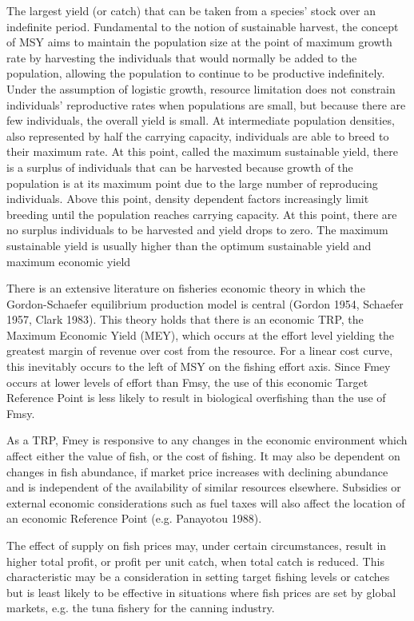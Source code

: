 \documentclass[12pt,oneline,a4paper,numbib]{ouparticle}
\numberwithin{equation}{subsection} %
\begin{document}
The largest yield (or catch) that can be taken from a species' stock over an indefinite period. Fundamental to the notion of sustainable harvest, the concept of MSY aims to maintain the population size at the point of maximum growth rate by harvesting the individuals that would normally be added to the population, allowing the population to continue to be productive indefinitely. Under the assumption of logistic growth, resource limitation does not constrain individuals’ reproductive rates when populations are small, but because there are few individuals, the overall yield is small. At intermediate population densities, also represented by half the carrying capacity, individuals are able to breed to their maximum rate. At this point, called the maximum sustainable yield, there is a surplus of individuals that can be harvested because growth of the population is at its maximum point due to the large number of reproducing individuals. Above this point, density dependent factors increasingly limit breeding until the population reaches carrying capacity. At this point, there are no surplus individuals to be harvested and yield drops to zero. The maximum sustainable yield is usually higher than the optimum sustainable yield and maximum economic yield

There is an extensive literature on fisheries economic theory in which the Gordon-Schaefer equilibrium production model is central (Gordon 1954, Schaefer 1957, Clark 1983). This theory holds that there is an economic TRP, the Maximum Economic Yield (MEY), which occurs at the effort level yielding the greatest margin of revenue over cost from the resource. 
For a linear cost curve, this inevitably occurs to the left of MSY on the fishing effort axis. Since Fmey occurs at lower levels of effort than Fmsy, the use of this economic Target Reference Point is less likely to result in biological overfishing than the use of Fmsy.

As a TRP, Fmey is responsive to any changes in the economic environment which affect either the value of fish, or the cost of fishing. It may also be dependent on changes in fish abundance, if market price increases with declining abundance and is independent of the availability of similar resources elsewhere. Subsidies or external economic considerations such as fuel taxes will also affect the location of an economic Reference Point (e.g. Panayotou 1988).

The effect of supply on fish prices may, under certain circumstances, result in higher total profit, or profit per unit catch, when total catch is reduced. This characteristic may be a consideration in setting target fishing levels or catches but is least likely to be effective in situations where fish prices are set by global markets, e.g. the tuna fishery for the canning industry.
\end{document}
